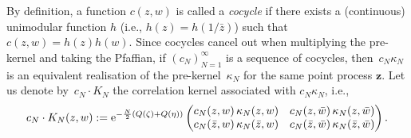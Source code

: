 By definition, a function $c(z,w)$ is called a \textit{cocycle} if there exists a (continuous) unimodular function $h$ (i.e., $h(z)=h(1/\bar{z})$) such that $c(z,w) = h(z)h(w).$ Since cocycles cancel out when multiplying the pre-kernel and taking the Pfaffian, if $(c_N)_{N=1}^\infty$ is a sequence of cocycles, then~$c_N\kappa_N$ is an equivalent realisation of the pre-kernel~$\kappa_N$
for the same point process $\boldsymbol{z}$. Let us denote by~$c_N \cdot K_N$ the correlation kernel associated with $c_N \kappa_N$, i.e.,
\begin{gather*}
c_N \cdot K_N(z,w):= {\rm e}^{ -\frac{N}{2} (Q( \zeta )+Q( \eta )) } \begin{pmatrix}
	 c_N(z,w)\, \kappa_N(z,w) & c_N(z,\bar{w})\, \kappa_N(z,\bar{w}) \\
	c_N(\bar{z},w)\, \kappa_N(\bar{z},w) & c_N(\bar{z},\bar{w}) \, \kappa_N(\bar{z},\bar{w})
	\end{pmatrix}.
\end{gather*}
